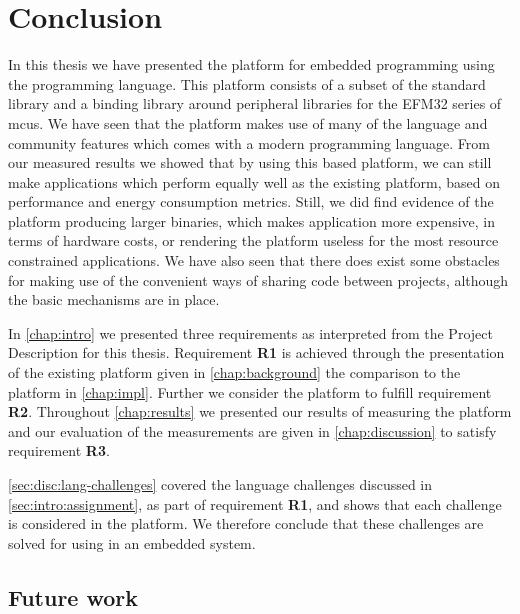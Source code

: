 
\chapter{Conclusion}
\label{chap:conclusion}

In this thesis we have presented the {\rg} platform for embedded programming using the {\rust} programming language.
This platform consists of a subset of the {\rust} standard library and a binding library around peripheral libraries for the EFM32 series of \glspl{mcu}.
We have seen that the platform makes use of many of the language and community features which comes with a modern programming language.
From our measured results we showed that by using this {\rust} based platform, we can still make applications which perform equally well as the existing {\C} platform, based on performance and energy consumption metrics.
Still, we did find evidence of the platform producing larger binaries, which makes {\rust} application more expensive, in terms of hardware costs, or rendering the platform useless for the most resource constrained applications.
We have also seen that there does exist some obstacles for making use of the convenient ways of sharing code between projects, although the basic mechanisms are in place.

In \autoref{chap:intro} we presented three requirements as interpreted from the Project Description for this thesis.
Requirement \textbf{R1} is achieved through the presentation of the existing {\C} platform given in \autoref{chap:background} the comparison to the {\rust} platform in \autoref{chap:impl}.
Further we consider the {\rg} platform to fulfill requirement \textbf{R2}.
Throughout \autoref{chap:results} we presented our results of measuring the {\rg} platform and our evaluation of the measurements are given in \autoref{chap:discussion} to satisfy requirement \textbf{R3}.

\autoref{sec:disc:lang-challenges} covered the language challenges discussed in \autoref{sec:intro:assignment}, as part of requirement \textbf{R1}, and shows that each challenge is considered in the {\rg} platform.
We therefore conclude that these challenges are solved for using {\rust} in an embedded system.

\section{Future work}
\label{chap:future}

